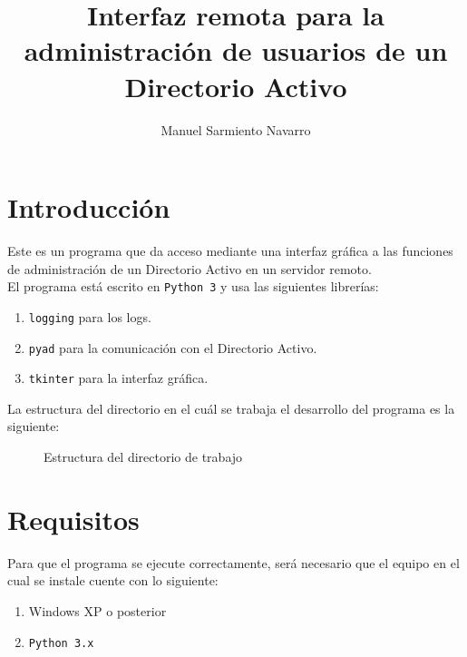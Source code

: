 \documentclass{itam}
\begin{document}


\title{Interfaz remota para la administración de usuarios de un Directorio Activo}
\author{Manuel Sarmiento Navarro}
\maketitle

\section{Introducción}
Este es un programa que da acceso mediante una interfaz gráfica a las funciones de administración de un Directorio Activo en un servidor remoto. \\
El programa está escrito en \verb|Python 3| y usa las siguientes librerías:
\begin{enumerate}
    \item \verb|logging| para los logs.
    \item \verb|pyad| para la comunicación con el Directorio Activo.
    \item \verb|tkinter| para la interfaz gráfica.
\end{enumerate}

La estructura del directorio en el cuál se trabaja el desarrollo del programa es la siguiente:
\begin{figure}[H]
\centering
{}
\caption{Estructura del directorio de trabajo}
\end{figure}

\section{Requisitos}
Para que el programa se ejecute correctamente, será necesario que el equipo en el cual se instale cuente con lo siguiente:
\begin{enumerate}
    \item Windows XP o posterior
    \item \verb|Python 3.x|
\end{enumerate}
\end{document}
